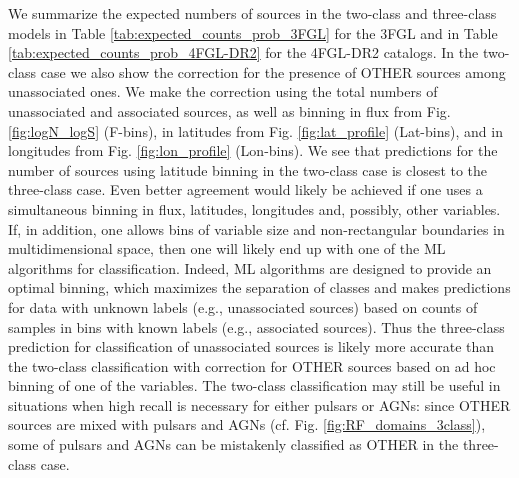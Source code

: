\documentclass[referee]{aa} %
\begin{document}
We summarize the expected numbers of sources in the two-class and three-class models in Table \ref{tab:expected_counts_prob_3FGL} for the 3FGL and in Table \ref{tab:expected_counts_prob_4FGL-DR2} for the 4FGL-DR2 catalogs.
In the two-class case we also show the correction for the presence of OTHER sources among unassociated ones.
We make the correction using the total numbers of unassociated and associated sources, as well as binning in flux from Fig. \ref{fig:logN_logS} (F-bins), in latitudes from Fig. \ref{fig:lat_profile} (Lat-bins), and in longitudes from Fig. \ref{fig:lon_profile} (Lon-bins).
We see that predictions for the number of sources using latitude binning in the two-class case is closest to the three-class case.
Even better agreement would likely be achieved if one uses a simultaneous binning in flux, latitudes, longitudes and, possibly, other variables.
If, in addition, one allows bins of variable size and non-rectangular boundaries in multidimensional space, then one will likely end up with one of the ML algorithms for classification.
Indeed, ML algorithms are designed to provide an optimal binning, which maximizes the separation of classes and makes predictions for data with unknown labels (e.g., unassociated sources) based on counts of samples in bins with known labels (e.g., associated sources).
Thus the three-class prediction for classification of unassociated sources is likely more accurate than the two-class classification with correction for OTHER sources based on ad hoc binning of one of the variables.
The two-class classification may still be useful in situations when high recall is necessary for either pulsars or AGNs:
since OTHER sources are mixed with pulsars and AGNs (cf. Fig. \ref{fig:RF_domains_3class}), 
some of pulsars and AGNs can be mistakenly classified as OTHER in the three-class case.
\end{document}
